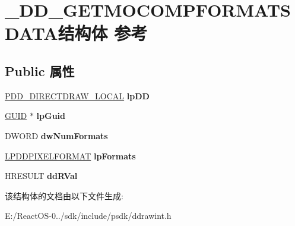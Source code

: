 \hypertarget{struct___d_d___g_e_t_m_o_c_o_m_p_f_o_r_m_a_t_s_d_a_t_a}{}\section{\+\_\+\+D\+D\+\_\+\+G\+E\+T\+M\+O\+C\+O\+M\+P\+F\+O\+R\+M\+A\+T\+S\+D\+A\+T\+A结构体 参考}
\label{struct___d_d___g_e_t_m_o_c_o_m_p_f_o_r_m_a_t_s_d_a_t_a}
\subsection*{Public 属性}
\begin{DoxyCompactItemize}
\item 
\mbox{\label{struct___d_d___g_e_t_m_o_c_o_m_p_f_o_r_m_a_t_s_d_a_t_a_a402b9050dc2da9aefe03d0b314b0cc09}} 
\hyperlink{struct___d_d___d_i_r_e_c_t_d_r_a_w___l_o_c_a_l}{P\+D\+D\+\_\+\+D\+I\+R\+E\+C\+T\+D\+R\+A\+W\+\_\+\+L\+O\+C\+AL} {\bfseries lp\+DD}
\item 
\mbox{\label{struct___d_d___g_e_t_m_o_c_o_m_p_f_o_r_m_a_t_s_d_a_t_a_aceefcda494ee0cc016387813c81631b1}} 
\hyperlink{interface_g_u_i_d}{G\+U\+ID} $\ast$ {\bfseries lp\+Guid}
\item 
\mbox{\label{struct___d_d___g_e_t_m_o_c_o_m_p_f_o_r_m_a_t_s_d_a_t_a_a70ebf6451a764ca2b2ef5f2df9188250}} 
D\+W\+O\+RD {\bfseries dw\+Num\+Formats}
\item 
\mbox{\label{struct___d_d___g_e_t_m_o_c_o_m_p_f_o_r_m_a_t_s_d_a_t_a_aaaad26d6e9bcb313806108f57e8e9b82}} 
\hyperlink{interfacevoid}{L\+P\+D\+D\+P\+I\+X\+E\+L\+F\+O\+R\+M\+AT} {\bfseries lp\+Formats}
\item 
\mbox{\label{struct___d_d___g_e_t_m_o_c_o_m_p_f_o_r_m_a_t_s_d_a_t_a_a5dd83981781c26de38222aa17c93776b}} 
H\+R\+E\+S\+U\+LT {\bfseries dd\+R\+Val}
\end{DoxyCompactItemize}


该结构体的文档由以下文件生成\+:\begin{DoxyCompactItemize}
\item 
E\+:/\+React\+O\+S-\/0../sdk/include/psdk/ddrawint.\+h\end{DoxyCompactItemize}
